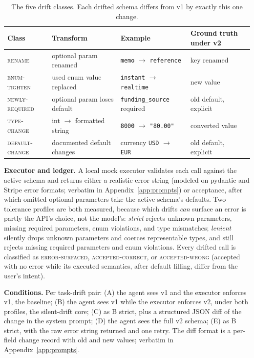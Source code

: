 \begin{table}[h]
\small
\centering
\begin{tabular}{llll}
\toprule
Class & Transform & Example & Ground truth under v2 \\
\midrule
\textsc{rename} & optional param renamed & \texttt{memo} $\to$ \texttt{reference} & key renamed \\
\textsc{enum-tighten} & used enum value replaced & \texttt{instant} $\to$ \texttt{realtime} & new value \\
\textsc{newly-required} & optional param loses default & \texttt{funding\_source} required & old default, explicit \\
\textsc{type-change} & int $\to$ formatted string & \texttt{8000} $\to$ \texttt{"80.00"} & converted value \\
\textsc{default-change} & documented default changes & currency \texttt{USD} $\to$ \texttt{EUR} & old default, explicit \\
\bottomrule
\end{tabular}
\caption{The five drift classes. Each drifted schema differs from v1 by exactly this one change.}
\label{tab:classes}
\end{table}

\textbf{Executor and ledger.} A local mock executor validates each call against the active schema and returns either a realistic error string (modeled on pydantic and Stripe error formats; verbatim in Appendix~\ref{app:prompts}) or acceptance, after which omitted optional parameters take the active schema's defaults. Two tolerance profiles are both measured, because which drifts \emph{can} surface an error is partly the API's choice, not the model's: \emph{strict} rejects unknown parameters, missing required parameters, enum violations, and type mismatches; \emph{lenient} silently drops unknown parameters and coerces representable types, and still rejects missing required parameters and enum violations. Every drifted call is classified as \textsc{error-surfaced}, \textsc{accepted-correct}, or \textsc{accepted-wrong} (accepted with no error while its executed semantics, after default filling, differ from the user's intent).

\textbf{Conditions.} Per task-drift pair: (A) the agent sees v1 and the executor enforces v1, the baseline; (B) the agent sees v1 while the executor enforces v2, under both profiles, the silent-drift core; (C) as B strict, plus a structured JSON diff of the change in the system prompt; (D) the agent sees the full v2 schema; (E) as B strict, with the raw error string returned and one retry. The diff format is a per-field change record with old and new values; verbatim in Appendix~\ref{app:prompts}.

